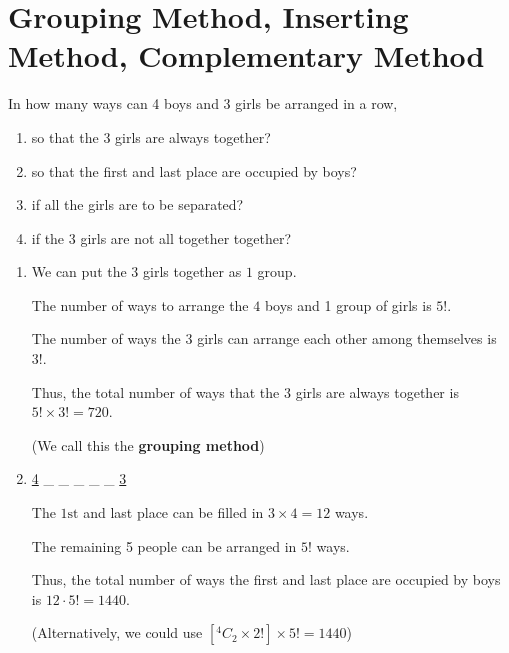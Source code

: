 \documentclass[11pt,a4paper]{book}
\begin{document}
\newpage


\section{Grouping Method, Inserting Method, Complementary Method}

\begin{example}

In how many ways can 4 boys and 3 girls be arranged in a row,

\begin{enumerate}[label=(\alph*)]

\item  so that the 3 girls are always together?

\item  so that the first and last place are occupied by boys?

\item  if all the girls are to be separated?

\item  if the 3 girls are not all together together?

\end{enumerate}

\Solution

\begin{enumerate}[label=(\alph*)]

\item  We can put the $3$ girls together as $1$ group.

The number of ways to arrange the $4$ boys and 1 group of girls is
$5!$.

The number of ways the $3$ girls can arrange each other among themselves
is $3!$.

Thus, the total number of ways that the $3$ girls are always together
is $5!\times3!=720$.

(We call this the \textbf{grouping method})

\item  \uline{4} \_ \_ \_ \_ \_ \uline{3}

The $1\text{st}$ and last place can be filled in $3\times4=12$ ways.

The remaining 5 people can be arranged in $5!$ ways.

Thus, the total number of ways the first and last place are occupied
by boys is $12\cdot5!=1440$.

(Alternatively, we could use $\left[^{4}C_{2}\times2!\right]\times5!=1440$)


\end{enumerate}
\end{example}
\end{document}
